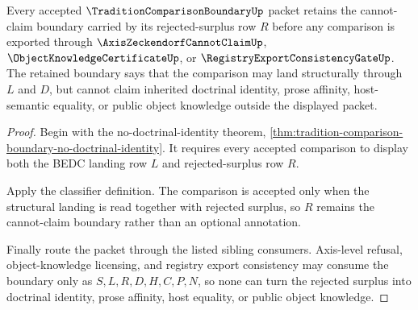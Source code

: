 \begin{theorem}
\label{thm:tradition-comparison-boundary-cannot-claim-obligation}
Every accepted $\TraditionComparisonBoundaryUp$ packet retains the cannot-claim boundary carried by its rejected-surplus row $R$ before any comparison is exported through $\AxisZeckendorfCannotClaimUp$, $\ObjectKnowledgeCertificateUp$, or $\RegistryExportConsistencyGateUp$. The retained boundary says that the comparison may land structurally through $L$ and $D$, but cannot claim inherited doctrinal identity, prose affinity, host-semantic equality, or public object knowledge outside the displayed packet.
\end{theorem}
\begin{proof}
Begin with the no-doctrinal-identity theorem, \autoref{thm:tradition-comparison-boundary-no-doctrinal-identity}. It requires every accepted comparison to display both the BEDC landing row $L$ and rejected-surplus row $R$.

Apply the classifier definition. The comparison is accepted only when the structural landing is read together with rejected surplus, so $R$ remains the cannot-claim boundary rather than an optional annotation.

Finally route the packet through the listed sibling consumers. Axis-level refusal, object-knowledge licensing, and registry export consistency may consume the boundary only as $S,L,R,D,H,C,P,N$, so none can turn the rejected surplus into doctrinal identity, prose affinity, host equality, or public object knowledge.
\end{proof}


